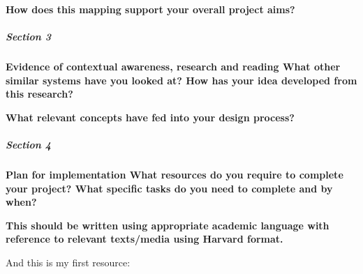 \documentclass[]{article}
\begin{document}
    \textbf{How does this mapping support your overall project aims?}

\subparagraph[]{Section 3}

    \textbf{Evidence of contextual awareness, research and reading What other similar
    systems have you looked at? How has your idea developed from this research? }
    
    \textbf{What relevant concepts have fed into your design process?}

\subparagraph[]{Section 4}
    
    \textbf{Plan for implementation What resources do you require to complete your
    project? What specific tasks do you need to complete and by when?}

    \textbf{This should be written using appropriate academic language with reference
    to relevant texts/media using Harvard format.}

    And this is my first resource: \cite{kevin}


\printbibliography
\end{document}

